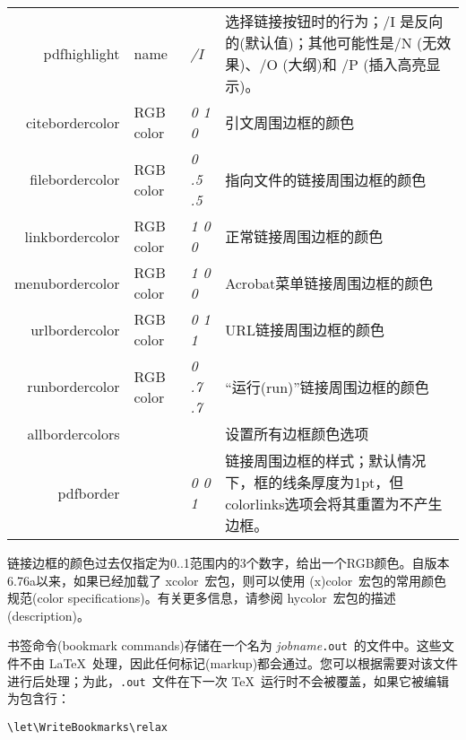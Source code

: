 \documentclass{article}
\newcommand*{\xpackage}[1]{\textsf{#1}}
\newcommand{\kaiti}{\CJKfamily{kaiti}} %
\begin{document}
\begin{longtable}{@{}>{\ttfamily}rl>{\itshape}lp{7.6cm}@{}}
pdfhighlight       & name      & /I      & 选择链接按钮时的行为；/I 是反向的(默认值)；其他可能性是/N (无效果)、/O (大纲)和 /P (插入高亮显示)。\\
citebordercolor    & RGB color & 0 1 0   & 引文周围边框的颜色\\
filebordercolor    & RGB color & 0 .5 .5 & 指向文件的链接周围边框的颜色\\
linkbordercolor    & RGB color & 1 0 0   & 正常链接周围边框的颜色\\
menubordercolor    & RGB color & 1 0 0   & Acrobat菜单链接周围边框的颜色\\
urlbordercolor     & RGB color & 0 1 1   & URL链接周围边框的颜色  \\
runbordercolor     & RGB color & 0 .7 .7 & “运行(run)”链接周围边框的颜色\\
allbordercolors    &           &         & 设置所有边框颜色选项\\
pdfborder          &           & 0 0 1   & 链接周围边框的样式；默认情况下，框的线条厚度为1pt，但colorlinks选项会将其重置为不产生边框。
\end{longtable}


链接边框的颜色过去{\kaiti 仅}指定为0..1范围内的3个数字，给出一个RGB颜色。自版本6.76a以来，如果已经加载了 \xpackage{xcolor}\ 宏包，则可以使用 \xpackage{(x)color}\ 宏包的常用颜色规范(color specifications)。有关更多信息，请参阅 \xpackage{hycolor}\ 宏包的描述(description)。

书签命令(bookmark commands)存储在一个名为 \textit{jobname}\texttt{.out}\ 的文件中。这些文件不由 \LaTeX\ 处理，因此任何标记(markup)都会通过。您可以根据需要对该文件进行后处理；为此，\texttt{.out}\ 文件在下一次 \TeX\ 运行时不会被覆盖，如果它被编辑为包含行：
\begin{verbatim}
\let\WriteBookmarks\relax
\end{verbatim}
\end{document}
